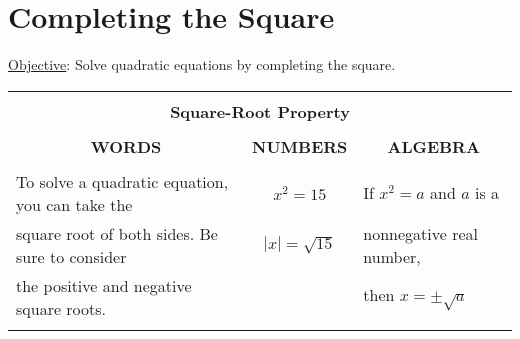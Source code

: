 \documentclass{report}
\theoremstyle{definition}
\begin{document}
\begin{enumerate}
\end{enumerate}

\vfill
\small
\color{red}
\begin{flushright}
\end{flushright}
\color{black}
\normalsize


 \newpage


 \section{ Completing the Square  }
 \setcounter{example}{0}
 \setcounter{definition}{0}
 \setcounter{youtry}{0}
 \hfill \underline{Objective}: Solve quadratic equations by completing the square.\\

\vspace{-0.5cm}

\begin{center}
	\begin{tabular}{|l|l|l|}
		\hline
		\multicolumn{3}{|l|}{}\\
		\multicolumn{3}{|c|}{\large\textbf{Square-Root Property} \normalsize}\\
		\hline
		&&\\
		\multicolumn{1}{|c|}{\textbf{WORDS}}&\multicolumn{1}{c|}{\textbf{NUMBERS}}&\multicolumn{1}{c|}{\textbf{ALGEBRA}}\\
		\hline
		&&\\
		To solve a quadratic equation, you can take the& \multicolumn{1}{c|}{$x^2=15$} & If $x^2=a$ and  $a$  is a \\
		square root of both sides. Be sure to consider& \multicolumn{1}{c|}{$|x| = \sqrt{15}$}&  nonnegative real number, \\
		the positive and negative square roots.&&  then $x=\pm\sqrt{a}$ \\
		& & \\
		\hline
	\end{tabular}
\end{center}
\end{document}

